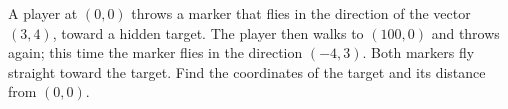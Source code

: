 A player at $(0,0)$ throws a marker that flies in the direction of the vector $(3,4)$, toward a hidden target. The player then walks to $(100,0)$ and throws again; this time the marker flies in the direction $(-4,3)$. Both markers fly straight toward the target. Find the coordinates of the target and its distance from $(0,0)$.
